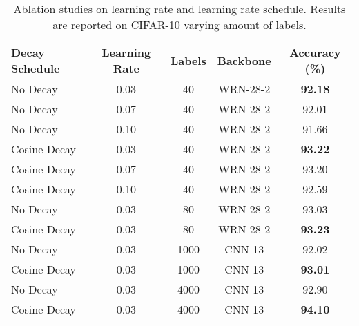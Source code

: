 \documentclass[lettersize,journal]{IEEEtran}
\theoremstyle{plain}
\theoremstyle{definition}
\theoremstyle{remark}
\begin{document}
\begin{table}[t]
\centering
  \footnotesize


  \caption{Ablation studies on learning rate and learning rate schedule. Results are reported on CIFAR-10 varying amount of labels.} 
     \vskip 0.1in
  \label{ap_lr}
   
  \begin{tabular}{@{}lcccc@{}}
  \toprule
  Decay Schedule       & Learning Rate   & Labels   & Backbone                             & Accuracy (\%) \\ \midrule
  No Decay             & 0.03       & 40            & WRN-28-2                                    & \textbf{92.18}   \\
  No Decay             & 0.07       & 40            & WRN-28-2                                    & 92.01    \\ 
  No Decay             & 0.10       & 40            & WRN-28-2                                    & 91.66    \\ \midrule 
  Cosine Decay         & 0.03       & 40            & WRN-28-2                                    & \textbf{93.22}    \\
  Cosine Decay         & 0.07       & 40            & WRN-28-2                                    & 93.20    \\ 
  Cosine Decay         & 0.10       & 40            & WRN-28-2                                    & 92.59    \\ \midrule 
  No Decay             & 0.03        & 80            & WRN-28-2                                     & 93.03    \\
  Cosine Decay         & 0.03           & 80         & WRN-28-2                                     & \textbf{93.23}    \\\midrule
  No Decay             & 0.03        & 1000          & CNN-13                                       & 92.02    \\
  Cosine Decay         & 0.03           & 1000       & CNN-13                                       & \textbf{93.01}    \\\midrule
  No Decay             & 0.03        & 4000          & CNN-13                                       & 92.90    \\
  Cosine Decay         & 0.03           & 4000       & CNN-13                                       & \textbf{94.10}    \\\bottomrule
  \end{tabular}
\end{table}
\end{document}
